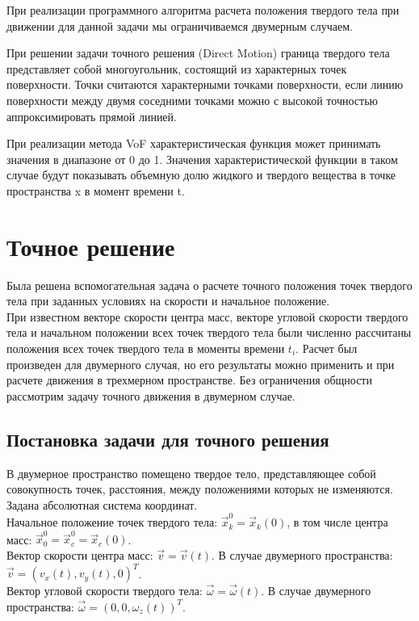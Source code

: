 \documentclass[12pt,a4paper]{article}
\begin{document}
При реализации программного алгоритма расчета положения твердого тела при движении для данной задачи мы ограничиваемся двумерным случаем.

При решении задачи точного решения (Direct Motion) граница твердого тела представляет собой многоугольник, состоящий из характерных точек поверхности. Точки считаются характерными точками поверхности, если линию поверхности между двумя соседними точками можно с высокой точностью аппроксимировать прямой линией.

При реализации метода VoF характеристическая функция может принимать значения в диапазоне от 0 до 1. Значения характеристической функции в таком случае будут показывать объемную долю жидкого и твердого вещества в точке пространства x в момент времени t.

\section{Точное решение}
Была решена вспомогательная задача о расчете точного положения точек твердого тела при заданных условиях на скорости и начальное положение.\\
При известном векторе скорости центра масс, векторе угловой скорости твердого тела и начальном положении всех точек твердого тела были численно рассчитаны положения всех точек твердого тела в моменты времени $t_i$.
Расчет был произведен для двумерного случая, но его результаты можно применить и при расчете движения в трехмерном пространстве.
Без ограничения общности рассмотрим задачу точного движения в двумерном случае.

\subsection{Постановка задачи для точного решения}
В двумерное пространство помещено твердое тело, представляющее собой совокупность точек, расстояния, между положениями которых не изменяются. Задана абсолютная система координат.\\
Начальное положение точек твердого тела: $\overrightarrow{x}_k^0 = \overrightarrow{x}_k(0)$, в том числе центра масс:  $\overrightarrow{x}_0^0 = \overrightarrow{x}_c^0 = \overrightarrow{x}_c(0)$.\\
Вектор скорости центра масс: $\overrightarrow{v}=\overrightarrow{v}(t)$. В случае двумерного пространства: $\overrightarrow{v}=(v_x(t), v_y(t), 0)^T$.\\
Вектор угловой скорости твердого тела: $\overrightarrow{\omega}=\overrightarrow{\omega}(t)$. В случае двумерного пространства: $\overrightarrow{\omega}=(0, 0, \omega_z(t))^T$.\\
\end{document}
